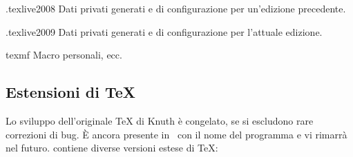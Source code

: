\documentclass{article}
\begin{document}
\begin{description}
\begin{ttdescription}
      \item[.texlive2008] Dati privati generati e di configurazione per
        un'edizione precedente.
      \item[.texlive2009] Dati privati generati e di configurazione per
        l'attuale edizione.
      \begin{ttdescription}
        \item [texmf-var\ \ \ ] 
        \item [texmf-config]    
      \end{ttdescription}
    \item[texmf]  Macro personali, ecc.
  \end{ttdescription}
\end{description}


\subsection{Estensioni di \protect\TeX}
\label{sec:tex-extensions}

Lo sviluppo dell'originale \TeX{} di Knuth è congelato, se si escludono
rare correzioni di bug. È ancora presente in \TL\ con il nome del
programma  e vi rimarrà nel futuro. \TL{} contiene diverse
versioni estese di \TeX:
\end{document}
